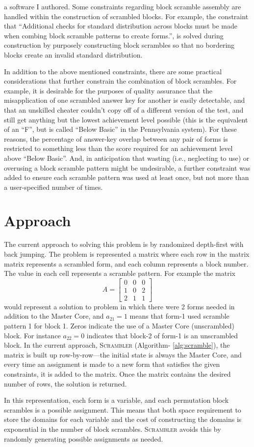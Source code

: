 \documentclass[11pt]{article}
\begin{document}
a software I authored.  Some constraints regarding block scramble
assembly are handled within the construction of scrambled blocks.  For
example, the constraint that ``Additional checks for standard
distribution across blocks must be made when combing block scramble
patterns to create forms.'', is solved during construction by
purposely constructing block scrambles so that no bordering blocks
create an invalid standard distribution.
\par
In addition to the above mentioned constraints, there are some
practical considerations that further constrain the combination of
block scrambles. For example, it is desirable for the purposes of
quality assurance that the misapplication of one scrambled answer key
for another is easily detectable, and that an unskilled cheater
couldn't copy off of a different version of the test, and still get
anything but the lowest achievement level possible (this is the
equivalent of an ``F'', but is called ``Below Basic'' in the
Pennsylvania system).  For these reasons, the percentage of answer-key
overlap between any pair of forms is restricted to something less than
the score required for an achievement level above ``Below Basic''.
And, in anticipation that wasting (i.e., neglecting to use) or
overusing a block scramble pattern might be undesirable, a further
constraint was added to ensure each scramble pattern was used at least
once, but not more than a user-specified number of times.
\section{Approach}
\par
The current approach to solving this problem is by randomized
depth-first with back jumping.  The problem is represented a matrix
where each row in the matrix matrix represents a scrambled form, and
each column represents a block number.  The value in each cell
represents a scramble pattern.  For example the matrix
\[
A =
\begin{bmatrix}
  0 & 0 & 0 \\
  1 & 0 & 2 \\
  2 & 1 & 1
\end{bmatrix}
\]
would represent a solution to problem in which there were 2 forms
needed in addition to the Master Core, and \(a_{21}=1\)
means that form-1 used scramble pattern 1 for block 1. Zeros indicate
the use of a Master Core (unscrambled) block.  For instance
\(a_{22} = 0\)
indicates that block-2 of form-1 is an unscrambled block. In the
current approach, \textsc{Scrambler} (Algorithm- \ref{alg:scramble}),
the matrix is built up row-by-row---the initial state is always the
Master Core, and every time an assignment is made to a new form that
satisfies the given constraints, it is added to the matrix.  Once the
matrix contains the desired number of rows, the solution is returned.
\par
In this representation, each form is a variable, and each permutation
block scrambles is a possible assignment. This means that both space
requirement to store the domains for each variable and the cost of
constructing the domains is exponential in the number of block
scrambles. \textsc{Scrambler} avoids this by randomly generating
possible assignments as needed.
\end{document}
